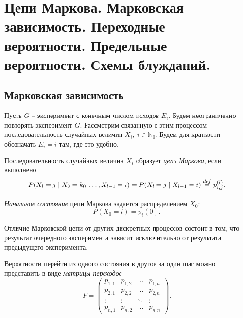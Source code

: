 \section{Цепи Маркова. Марковская зависимость. Переходные вероятности.
Предельные вероятности. Схемы блужданий.}

\subsection{Марковская зависимость}

Пусть $G$ -- эксперимент с конечным числом исходов $E_i$. Будем неограниченно
повторять эксперимент $G$. Рассмотрим связанную с этим процессом
последовательность случайных величин $X_i,~ i \in \mathbb{N}_0$. Будем для
краткости обозначать $E_i = i$ там, где это удобно.

\begin{definition}
    Последовательность случайных величин $X_i$ образует \textit{цепь Маркова}, 
    если выполнено
    \[
        P(X_l = j \mid X_0 = k_0, \ldots, X_{l - 1} = i) =
        P(X_l = j \mid X_{l - 1} = i) \overset{def}{\underset{}{=}} p^{(l)}_{i, j}
    .\]
\end{definition}

\begin{definition}
    \textit{Начальное состояние} цепи Маркова задается распределением
    $X_0$:
    \[
        P(X_0 = i) = p_i(0)
    .\]
\end{definition}

\begin{remark}
    Отличие Марковской цепи от других дискретных процессов состоит в том, что
    результат очередного эксперимента зависит исключительно от результата
    предыдущего эксперимента.
\end{remark}

\begin{definition}
     Вероятности перейти из одного состояния в другое за один шаг можно
     представить в виде \textit{матрицы переходов}
     \[
         P = \begin{pmatrix}
            p_{1, 1} & p_{1, 2} & \ldots & p_{1, n} \\
            p_{2, 1} & p_{2, 2} & \ldots & p_{2, n} \\
            \vdots & \vdots & \ddots & \vdots \\
            p_{n, 1} & p_{n, 2} & \ldots & p_{n, n}
         \end{pmatrix}   
     .\]
\end{definition}

